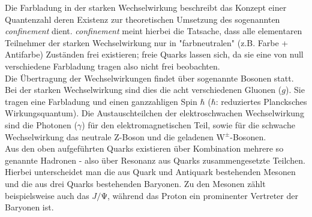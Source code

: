 Die Farbladung in der starken Wechselwirkung beschreibt das Konzept einer Quantenzahl deren Existenz zur theoretischen Umsetzung des sogenannten \textit{confinement} dient. \textit{confinement} meint hierbei die Tatsache, dass alle elementaren Teilnehmer der starken Wechselwirkung nur in "farbneutralen" (z.B. Farbe + Antifarbe) Zuständen frei existieren; freie Quarks lassen sich, da sie eine von null verschiedene Farbladung tragen also nicht frei beobachten.\\
%
Die Übertragung der Wechselwirkungen findet über sogenannte Bosonen statt. Bei der starken Wechselwirkung sind dies die acht verschiedenen Gluonen ($g$). Sie tragen eine Farbladung und einen ganzzahligen Spin $\hbar$ ($\hbar$: reduziertes Plancksches Wirkungsquantum). Die Austauschteilchen der elektroschwachen Wechselwirkung sind die Photonen ($\gamma$) für den elektromagnetischen Teil, sowie für die schwache Wechselwirkung das neutrale $\mathrm{Z}$-Boson und die geladenen $\mathrm{W^{\pm}}$-Bosonen. \\
%
Aus den oben aufgeführten Quarks existieren über Kombination mehrere so genannte Hadronen - also über Resonanz aus Quarks zusammengesetzte Teilchen. Hierbei unterscheidet man die aus Quark und Antiquark bestehenden Mesonen und die aus drei Quarks bestehenden Baryonen. Zu den Mesonen zählt beispielsweise auch das $J/\!\mathrm{\Psi}$, während das Proton ein prominenter Vertreter der Baryonen ist.
